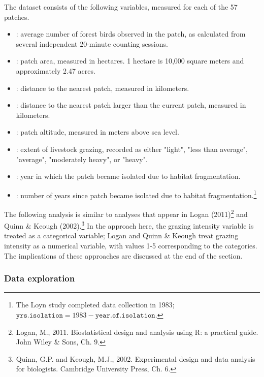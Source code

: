 The dataset consists of the following variables, measured for each of the 57 patches.
\begin{itemize}
  \item {}: average number of forest birds observed in the patch, as calculated from several independent 20-minute counting sessions. 

  \item {}: patch area, measured in hectares. 1 hectare is 10,000 square meters and approximately 2.47 acres.

  \item {}: distance to the nearest patch, measured in kilometers.

  \item {}: distance to the nearest patch larger than the current patch, measured in kilometers.

  \item {}: patch altitude, measured in meters above sea level.

  \item {}: extent of livestock grazing, recorded as either "light", "less than average", "average", "moderately heavy", or "heavy". 

  \item {}: year in which the patch became isolated due to habitat fragmentation.

  \item {}: number of years since patch became isolated due to habitat fragmentation.\footnote{The Loyn study completed data collection in 1983;  $\texttt{yrs.isolation} = 1983 - \texttt{year.of.isolation}$.}
\end{itemize}
 
The following analysis is similar to analyses that appear in Logan (2011)\footnote{Logan, M., 2011. Biostatistical design and analysis using R: a practical guide. John Wiley \& Sons, Ch. 9.} and Quinn \& Keough (2002).\footnote{Quinn, G.P. and Keough, M.J., 2002. Experimental design and data analysis for biologists. Cambridge University Press, Ch. 6.} In the approach here, the grazing intensity variable is treated as a categorical variable; Logan and Quinn \& Keough treat grazing intensity as a numerical variable, with values 1-5 corresponding to the categories. The implications of these approaches are discussed at the end of the section.
 
\subsubsection{Data exploration}


